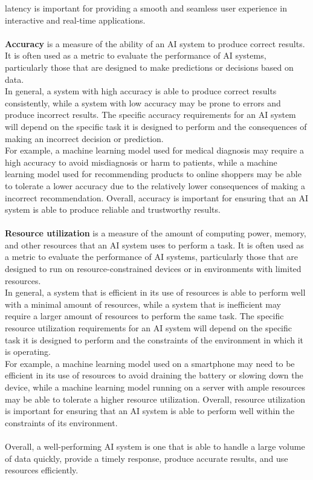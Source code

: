 latency is important for providing a smooth and seamless user experience in interactive and real-time applications.
\\
\\
\textbf{Accuracy} is a measure of the ability of an AI system to produce correct results.
It is often used as a metric to evaluate the performance of AI systems, particularly
those that are designed to make predictions or decisions based on data.
\\
In general, a system with high accuracy is able to produce correct results consistently,
while a system with low accuracy may be prone to errors and produce incorrect results.
The specific accuracy requirements for an AI system will depend on the specific task it is
designed to perform and the consequences of making an incorrect decision or prediction.
\\
For example, a machine learning model used for medical diagnosis may require a
high accuracy to avoid misdiagnosis or harm to patients, while a machine learning model
used for recommending products to online shoppers may be able to tolerate a lower accuracy due to
the relatively lower consequences of making a incorrect recommendation. Overall, accuracy is important for 
ensuring that an AI system is able to produce reliable and trustworthy results.
\\
\\
\textbf{Resource utilization} is a measure of the amount of computing power, memory, and other 
resources that an AI system uses to perform a task.
It is often used as a metric to evaluate the performance of AI systems, particularly those that 
are designed to run on resource-constrained devices or in environments with limited resources.
\\
In general, a system that is efficient in its use of resources is able to perform well with a 
minimal amount of resources, while a system that is inefficient may require a larger amount of 
resources to perform the same task. The specific resource utilization requirements for an AI system 
will depend on the specific task it is designed to perform and the constraints of the environment 
in which it is operating.
\\
For example, a machine learning model used on a smartphone may need to be efficient in its use of 
resources to avoid draining the battery or slowing down the device, while a machine learning model 
running on a server with ample resources may be able to tolerate a higher resource utilization. 
Overall, resource utilization is important for ensuring that an AI system is able to perform well within 
the constraints of its environment.
\\
\\
Overall, a well-performing AI system is one that is able to handle a 
large volume of data quickly, provide a timely response, produce accurate 
results, and use resources efficiently.

